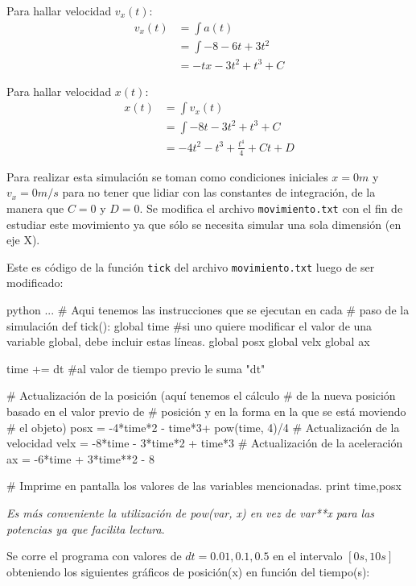\documentclass[12pt, a4paper]{article}
\begin{document}
Para hallar velocidad $v_x(t)$:
\begin{align*}
        v_x(t) &= \int a(t) \\
             &= \int -8 - 6t + 3t^2\\
             &= -tx - 3t^2 + t^3 + C
\end{align*}

Para hallar velocidad $x(t)$:
\begin{align*}
        x(t) &= \int v_x(t) \\
             &= \int -8t - 3t^2 + t^3 + C\\
             &= -4t^2 - t^3 + \frac{t^4}{4} + Ct + D
\end{align*}

Para realizar esta simulación se toman como condiciones iniciales $x=0m$ y $v_x=0m/s$ para no tener que lidiar con las constantes de integración, de la manera que $C=0$ y $D=0$. Se modifica el archivo \texttt{movimiento.txt} con el fin de estudiar este movimiento ya que sólo se necesita simular una sola dimensión (en eje X).

Este es código de la función \texttt{tick} del archivo \texttt{movimiento.txt} luego de ser modificado:


\begin{mintedbox}{python}
...
# Aqui tenemos las instrucciones que se ejecutan en cada
# paso de la simulación
def tick():
    global time #si uno quiere modificar el valor de una variable global, debe incluir estas líneas.
    global posx
    global velx
    global ax
    
    time += dt #al valor de tiempo previo le suma "dt"
     
    # Actualización de la posición (aquí tenemos el cálculo
    # de la nueva posición basado en el valor previo de 
    # posición y en la forma en la que se está moviendo 
    # el objeto)
    posx = -4*time*2 - time*3+ pow(time, 4)/4
    # Actualización de la velocidad 
    velx = -8*time - 3*time*2 + time*3
    # Actualización de la aceleración
    ax = -6*time + 3*time**2 - 8
    
    # Imprime en pantalla los valores de las variables mencionadas.
    print time,posx
\end{mintedbox}
\textit{Es más conveniente la utilización de pow(var, x) en vez de var**x para las potencias ya que facilita lectura}.

\vspace{0.5cm}
Se corre el programa con valores de $dt=0.01, 0.1, 0.5$ en el intervalo $[0s, 10s]$ obteniendo los siguientes gráficos de posición(x) en función del tiempo(s):
\end{document}
